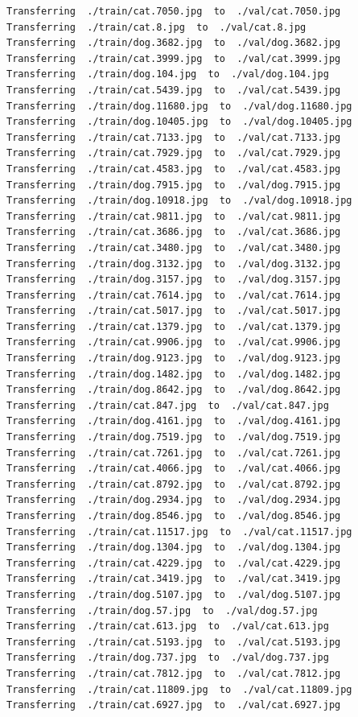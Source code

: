 \documentclass[]{book}
\theoremstyle{definition}
\theoremstyle{definition}
\theoremstyle{definition}
\theoremstyle{remark}
\begin{document}
\begin{verbatim}
Transferring  ./train/cat.7050.jpg  to  ./val/cat.7050.jpg
Transferring  ./train/cat.8.jpg  to  ./val/cat.8.jpg
Transferring  ./train/dog.3682.jpg  to  ./val/dog.3682.jpg
Transferring  ./train/cat.3999.jpg  to  ./val/cat.3999.jpg
Transferring  ./train/dog.104.jpg  to  ./val/dog.104.jpg
Transferring  ./train/cat.5439.jpg  to  ./val/cat.5439.jpg
Transferring  ./train/dog.11680.jpg  to  ./val/dog.11680.jpg
Transferring  ./train/dog.10405.jpg  to  ./val/dog.10405.jpg
Transferring  ./train/cat.7133.jpg  to  ./val/cat.7133.jpg
Transferring  ./train/cat.7929.jpg  to  ./val/cat.7929.jpg
Transferring  ./train/cat.4583.jpg  to  ./val/cat.4583.jpg
Transferring  ./train/dog.7915.jpg  to  ./val/dog.7915.jpg
Transferring  ./train/dog.10918.jpg  to  ./val/dog.10918.jpg
Transferring  ./train/cat.9811.jpg  to  ./val/cat.9811.jpg
Transferring  ./train/cat.3686.jpg  to  ./val/cat.3686.jpg
Transferring  ./train/cat.3480.jpg  to  ./val/cat.3480.jpg
Transferring  ./train/dog.3132.jpg  to  ./val/dog.3132.jpg
Transferring  ./train/dog.3157.jpg  to  ./val/dog.3157.jpg
Transferring  ./train/cat.7614.jpg  to  ./val/cat.7614.jpg
Transferring  ./train/cat.5017.jpg  to  ./val/cat.5017.jpg
Transferring  ./train/cat.1379.jpg  to  ./val/cat.1379.jpg
Transferring  ./train/cat.9906.jpg  to  ./val/cat.9906.jpg
Transferring  ./train/dog.9123.jpg  to  ./val/dog.9123.jpg
Transferring  ./train/dog.1482.jpg  to  ./val/dog.1482.jpg
Transferring  ./train/dog.8642.jpg  to  ./val/dog.8642.jpg
Transferring  ./train/cat.847.jpg  to  ./val/cat.847.jpg
Transferring  ./train/dog.4161.jpg  to  ./val/dog.4161.jpg
Transferring  ./train/dog.7519.jpg  to  ./val/dog.7519.jpg
Transferring  ./train/cat.7261.jpg  to  ./val/cat.7261.jpg
Transferring  ./train/cat.4066.jpg  to  ./val/cat.4066.jpg
Transferring  ./train/cat.8792.jpg  to  ./val/cat.8792.jpg
Transferring  ./train/dog.2934.jpg  to  ./val/dog.2934.jpg
Transferring  ./train/dog.8546.jpg  to  ./val/dog.8546.jpg
Transferring  ./train/cat.11517.jpg  to  ./val/cat.11517.jpg
Transferring  ./train/dog.1304.jpg  to  ./val/dog.1304.jpg
Transferring  ./train/cat.4229.jpg  to  ./val/cat.4229.jpg
Transferring  ./train/cat.3419.jpg  to  ./val/cat.3419.jpg
Transferring  ./train/dog.5107.jpg  to  ./val/dog.5107.jpg
Transferring  ./train/dog.57.jpg  to  ./val/dog.57.jpg
Transferring  ./train/cat.613.jpg  to  ./val/cat.613.jpg
Transferring  ./train/cat.5193.jpg  to  ./val/cat.5193.jpg
Transferring  ./train/dog.737.jpg  to  ./val/dog.737.jpg
Transferring  ./train/cat.7812.jpg  to  ./val/cat.7812.jpg
Transferring  ./train/cat.11809.jpg  to  ./val/cat.11809.jpg
Transferring  ./train/cat.6927.jpg  to  ./val/cat.6927.jpg

\end{verbatim}
\end{document}
